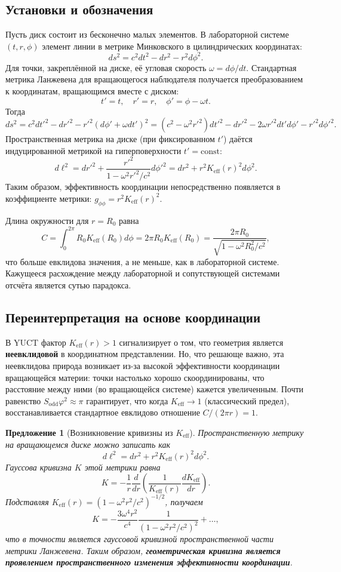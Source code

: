 \documentclass[12pt,a4paper]{article}
\newtheorem{proposition}{Предложение}[section]
\newcommand{\Sodd}{S_{\mathrm{odd}}}
\begin{document}
	\subsection{Установки и обозначения}
	Пусть диск состоит из бесконечно малых элементов. В лабораторной системе \((t, r, \phi)\) элемент линии в метрике Минковского в цилиндрических координатах:
	\[
	ds^2 = c^2 dt^2 - dr^2 - r^2 d\phi^2.
	\]
	Для точки, закреплённой на диске, её угловая скорость \(\omega = d\phi/dt\). Стандартная метрика Ланжевена для вращающегося наблюдателя получается преобразованием к координатам, вращающимся вместе с диском:
	\[
	t' = t,\quad r' = r,\quad \phi' = \phi - \omega t.
	\]
	Тогда
	\[
	ds^2 = c^2 dt'^2 - dr'^2 - r'^2 (d\phi' + \omega dt')^2 = (c^2 - \omega^2 r'^2) dt'^2 - dr'^2 - 2\omega r'^2 dt' d\phi' - r'^2 d\phi'^2.
	\]
	Пространственная метрика на диске (при фиксированном \(t'\)) даётся индуцированной метрикой на гиперповерхности \(t' = \text{const}\):
	\[
	d\ell^2 = dr'^2 + \frac{r'^2}{1 - \omega^2 r'^2/c^2} d\phi'^2 = dr^2 + r^2 K_{\mathrm{eff}}(r)^2 d\phi^2.
	\]
	Таким образом, эффективность координации непосредственно появляется в коэффициенте метрики: \(g_{\phi\phi} = r^2 K_{\mathrm{eff}}(r)^2\).
	
	Длина окружности для \(r = R_0\) равна
	\[
	C = \int_0^{2\pi} R_0 K_{\mathrm{eff}}(R_0) d\phi = 2\pi R_0 K_{\mathrm{eff}}(R_0) = \frac{2\pi R_0}{\sqrt{1 - \omega^2 R_0^2/c^2}},
	\]
	что больше евклидова значения, а не меньше, как в лабораторной системе. Кажущееся расхождение между лабораторной и сопутствующей системами отсчёта является сутью парадокса.
	
	\subsection{Переинтерпретация на основе координации}
	В YUCT фактор \(K_{\mathrm{eff}}(r) > 1\) сигнализирует о том, что геометрия является \textbf{неевклидовой} в координатном представлении. Но, что решающе важно, эта неевклидова природа возникает из-за высокой эффективности координации вращающейся материи: точки настолько хорошо скоординированы, что расстояние между ними (во вращающейся системе) кажется увеличенным. Почти равенство \(\Sodd \varphi^2 \approx \pi\) гарантирует, что когда \(K_{\mathrm{eff}} \to 1\) (классический предел), восстанавливается стандартное евклидово отношение \(C/(2\pi r) = 1\).
	
	\begin{proposition}[Возникновение кривизны из \(K_{\mathrm{eff}}\)]
		Пространственную метрику на вращающемся диске можно записать как
		\[
		d\ell^2 = dr^2 + r^2 K_{\mathrm{eff}}(r)^2 d\phi^2.
		\]
		Гауссова кривизна \(K\) этой метрики равна
		\[
		K = -\frac{1}{r} \frac{d}{dr}\left( \frac{1}{K_{\mathrm{eff}}(r)} \frac{dK_{\mathrm{eff}}}{dr} \right).
		\]
		Подставляя \(K_{\mathrm{eff}}(r) = (1 - \omega^2 r^2/c^2)^{-1/2}\), получаем
		\[
		K = -\frac{3\omega^4 r^2}{c^4} \frac{1}{(1 - \omega^2 r^2/c^2)^2} + \dots,
		\]
		что в точности является гауссовой кривизной пространственной части метрики Ланжевена. Таким образом, \textbf{геометрическая кривизна является проявлением пространственного изменения эффективности координации}.
	\end{proposition}
	
\end{document}
